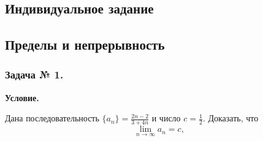 \documentclass{article}
\begin{document}
\begin{flushleft}

\section {Индивидуальное задание}
\subsection{Пределы и непрерывность}
\subsubsection*{\center Задача № 1.}
{\bf Условие.~}

Дана последовательность $\{a_n\} = \frac{2n-2}{3+4n}$  и число $c=\frac{1}{2}$. Доказать, что 
$$\lim\limits_{n\rightarrow\infty}a_n=c,$$


\end{flushleft}
\end{document}
